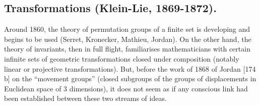 \subsection{Transformations (Klein-Lie, 1869-1872).}


Around 1860, the theory of permutation groups of a finite set is developing and begins to be used (Serret, Kronecker, Mathieu, Jordan). On the other hand, the theory of invariants, then in full flight, familiarises mathematicians with certain infinite sets of geometric transformations closed under composition (notably linear or projective transformations). But, before the work of 1868 of Jordan {[}174 b{]} on the ``movement groups'' (closed subgroups of the groups of displacements in Euclidean space of 3 dimensions), it does not seem as if any conscious link had been established between these two streams of ideas.

